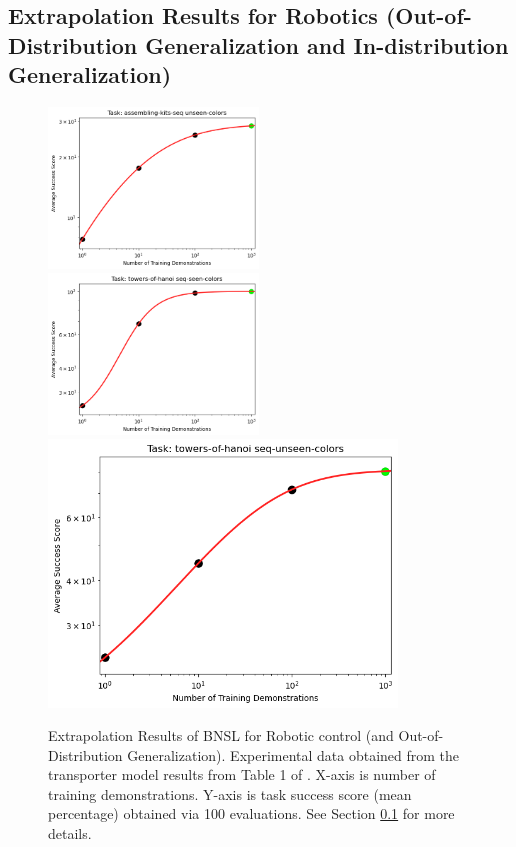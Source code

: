 \documentclass{article} %
\begin{document}
\subsection{Extrapolation Results for Robotics (Out-of-Distribution Generalization and In-distribution Generalization)}
\label{section:robot}
\vspace{-3.0mm}
\begin{figure}[htbp]
    \centering
\includegraphics[width=0.497\textwidth]{figures/robot/assembling-kits-seq_unseen-colors.png}
\includegraphics[width=0.497\textwidth]{figures/robot/towers-of-hanoi_seq-seen-colors.png}
\includegraphics[width=0.825\textwidth]{figures/robot/towers-of-hanoi_seq-unseen-colors.png}
\vspace{-3.0mm}
    \caption{
Extrapolation Results of BNSL for Robotic control (and Out-of-Distribution Generalization). Experimental data obtained from the transporter \citep{zeng2021transporter} model results from Table 1 of \cite{shridhar2021cliport}. X-axis is number of training demonstrations. Y-axis is task success score (mean percentage) obtained via 100 evaluations. See Section \ref{section:robot} for more details.
    }
    \label{fig:robot}
\end{figure}
\end{document}
